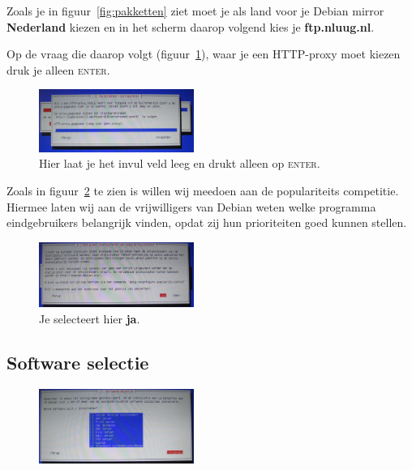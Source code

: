 \documentclass[12pt,a4paper]{article}
\begin{document}
Zoals je in figuur~\ref{fig:pakketten} ziet moet je als land voor je Debian mirror \textbf{Nederland} kiezen en in het scherm daarop volgend kies je \textbf{ftp.nluug.nl}. 


Op de vraag die daarop volgt (figuur~\ref{fig:httpproxy}), waar je een HTTP-proxy moet kiezen druk je alleen \textsc{enter}.

\begin{figure}[H]
\centering
\includegraphics[width=0.45\textwidth]{pakketbeheer-proxy-scherm}
\caption{Hier laat je het invul veld leeg en drukt alleen op \textsc{enter}.}
\label{fig:httpproxy}
\end{figure}

Zoals in figuur~\ref{fig:popcon} te zien is willen wij meedoen aan de populariteits competitie. Hiermee laten wij aan de vrijwilligers van Debian weten welke programma eindgebruikers belangrijk vinden, opdat zij hun prioriteiten goed kunnen stellen.

\begin{figure}[H]
\centering
\includegraphics[width=0.45\textwidth]{populariteits-contest-scherm}
\caption{Je selecteert hier \textbf{ja}.}
\label{fig:popcon}
\end{figure}

\subsection{Software selectie}

\begin{figure}[H]
\centering
\includegraphics[width=0.45\textwidth]{software-selectie-scherm}
\label{fig:software-selectie-scherm}
\end{figure}
\end{document}
